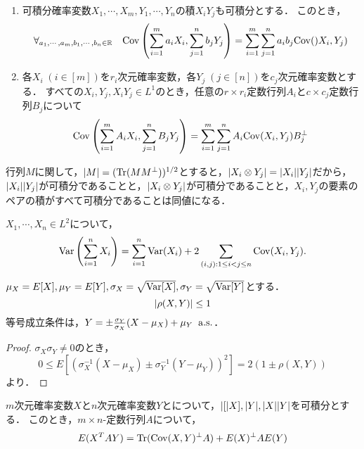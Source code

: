 \documentclass[uplatex,dvipdfmx]{jsreport}
\begin{document}
\begin{proposition}[共分散行列の双線型性]\mbox{}
    \begin{enumerate}
        \item 可積分確率変数$X_1,\cdots,X_m,Y_1,\cdots,Y_n$の積$X_iY_j$も可積分とする．
        このとき，
        \[\forall_{a_1,\cdots,a_m,b_1,\cdots,b_n\in\mathbb{R}}\quad\mathrm{Cov}\left(\sum^m_{i=1}a_iX_i,\sum_{j=1}^nb_jY_j\right)=\sum^m_{i=1}\sum^n_{j=1}a_ib_j\mathrm{Cov}()X_i,Y_j)\]
        \item 各$X_i\;(i\in[m])$を$r_i$次元確率変数，各$Y_j\;(j\in[n])$を$c_j$次元確率変数とする．
        すべての$X_i,Y_j,X_iY_j\in L^1$のとき，任意の$r\times r_i$定数行列$A_i$と$c\times c_j$定数行列$B_j$について
        \[\mathrm{Cov}\left(\sum_{i=1}^mA_iX_i,\sum^n_{j=1}B_jY_j\right)=\sum^m_{i=1}\sum^n_{j=1}A_i\mathrm{Cov}(X_i,Y_j)B_j^\perp\]
    \end{enumerate}
\end{proposition}
\begin{remark}
    行列$M$に関して，$\lvert M\rvert=(\mathrm{Tr}(MM^\perp))^{1/2}$とすると，$\lvert X_i\otimes Y_j\rvert=\lvert X_i\rvert\lvert Y_j\rvert$だから，$\lvert X_i\rvert\lvert Y_j\rvert$が可積分であることと，$\lvert X_i\otimes Y_j\rvert$が可積分であることと，$X_i,Y_j$の要素のペアの積がすべて可積分であることは同値になる．
\end{remark}

\begin{proposition}[和の分散]
    $X_1,\cdots,X_n\in L^2$について，
    \[\mathrm{Var}\left(\sum^n_{i=1}X_i\right)=\sum^n_{i=1}\mathrm{Var}(X_i)+2\sum_{(i,j):1\le i<j\le n}\mathrm{Cov}(X_i,Y_j).\]
\end{proposition}

\begin{proposition}[相関係数の値域]
    $\mu_X=E[X],\mu_Y=E[Y],\sigma_X=\sqrt{\mathrm{Var}[X]},\sigma_Y=\sqrt{\mathrm{Var}[Y]}$とする．
    \[\lvert\rho(X,Y)\rvert\le 1\]
    等号成立条件は，$Y=\pm\frac{\sigma_Y}{\sigma_X}(X-\mu_X)+\mu_Y\;\;\mathrm{a.s.}$．
\end{proposition}
\begin{proof}
    $\sigma_X\sigma_Y\ne 0$のとき，
    \[0\le E[(\sigma_X^{-1}(X-\mu_X)\pm\sigma_Y^{-1}(Y-\mu_Y))^2]=2(1\pm\rho(X,Y))\]
    より．
\end{proof}

\begin{proposition}[ランダムな双線型形式の期待値]
    $m$次元確率変数$X$と$n$次元確率変数$Y$とについて，$\lvert[\rvert X],\lvert Y\rvert,\lvert X\rvert\lvert Y\rvert$を可積分とする．
    このとき，$m\times n$-定数行列$A$について，
    \[E(X^TAY)=\mathrm{Tr}(\mathrm{Cov}(X,Y)^\perp A)+E(X)^\perp AE(Y)\]
\end{proposition}
\end{document}

